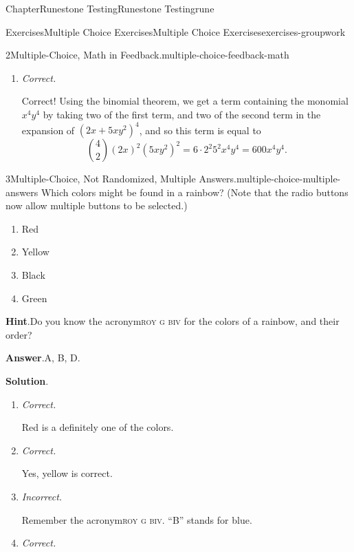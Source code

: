 \documentclass[oneside,10pt,]{book}
\newcommand{\blocktitlefont}{\relax}
\newcommand{\acronym}[1]{\textsc{\MakeLowercase{#1}}}
\newcommand{\lititle}[1]{{\slshape#1}}
\numberwithin{equation}{section}
\begin{document}
\begin{chapterptx}{Chapter}{Runestone Testing}{}{Runestone Testing}{}{}{rune}
\begin{exercises-section}{Exercises}{Multiple Choice Exercises}{}{Multiple Choice Exercises}{}{}{exercises-groupwork}
\begin{divisionexercise}{2}{Multiple-Choice, Math in Feedback.}{}{multiple-choice-feedback-math}
\begin{enumerate}[label={\Alph*.}]
Have you included something of the form \(\binom{n}{k}\) in your computations?%
\item{}\lititle{Correct.}\par%
Correct! Using the binomial theorem, we get a term containing the monomial \(x^4y^4\) by taking two of the first term, and two of the second term in the expansion of \((2x+5xy^2)^4\), and so this term is equal to%
\begin{equation*}
\binom{4}{2} (2x)^2 (5xy^2)^2 = 6 \cdot 2^2 5^2 x^4 y^4 = 600 x^4 y^4\text{.}
\end{equation*}
%
\end{enumerate}
%
\end{divisionexercise}%
\begin{divisionexercise}{3}{Multiple-Choice, Not Randomized, Multiple Answers.}{}{multiple-choice-multiple-answers}%
%
Which colors might be found in a rainbow?  (Note that the radio buttons now allow multiple buttons to be selected.)%
\par
%
\begin{enumerate}[label={\Alph*.}]
\item{}Red%
\item{}Yellow%
\item{}Black%
\item{}Green%
\end{enumerate}
%
\par\smallskip%
\noindent\textbf{\blocktitlefont Hint}.\hypertarget{multiple-choice-multiple-answers-4}{}\quad{}Do you know the acronym\textellipsis{}\acronym{ROY G BIV} for the colors of a rainbow, and their order?%
\par\smallskip%
\noindent\textbf{\blocktitlefont Answer}.\hypertarget{multiple-choice-multiple-answers-5}{}\quad{}A, B, D.%
\par\smallskip%
\noindent\textbf{\blocktitlefont Solution}.\hypertarget{multiple-choice-multiple-answers-6}{}\quad{}%
\begin{enumerate}[label={\Alph*.}]
\item{}\lititle{Correct.}\par%
Red is a definitely one of the colors.%
\item{}\lititle{Correct.}\par%
Yes, yellow is correct.%
\item{}\lititle{Incorrect.}\par%
Remember the acronym\textellipsis{}\acronym{ROY G BIV}.  ``B'' stands for blue.%
\item{}\lititle{Correct.}\par%

\end{enumerate}
\end{divisionexercise}
\end{exercises-section}
\end{chapterptx}
\end{document}
